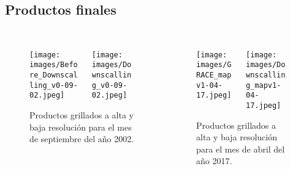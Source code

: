 \documentclass{beamer}
\begin{document}
  \subsection*{Productos finales}

  \begin{frame}
    \frametitle{}

    \begin{columns}
      \begin{column}{0.5\textwidth}

        \begin{figure}

        \begin{columns}
          \begin{column}{0.5\textwidth}
            \texttt{[image: images/Before\_Downscalling\_v0-09-02.jpeg]}
          \end{column}

          \begin{column}{0.5\textwidth}
            \centering
            \texttt{[image: images/Downscalling\_v0-09-02.jpeg]}
          \end{column}
        \end{columns}

        \caption{Productos grillados a alta y baja resolución para el mes de septiembre del año 2002.}
        \end{figure}
      \end{column}

      \begin{column}{0.5\textwidth}

        \begin{figure}

          \begin{columns}

            \begin{column}{0.5\textwidth}
              \texttt{[image: images/GRACE\_mapv1-04-17.jpeg]}
            \end{column}

            \begin{column}{0.5\textwidth}
              \centering
              \texttt{[image: images/Downscalling\_mapv1-04-17.jpeg]}
            \end{column}

          \end{columns}

          \caption{Productos grillados a alta y baja resolución para el mes de abril del año 2017.}
        \end{figure}
      \end{column}
    \end{columns}
  \end{frame}
\end{document}

